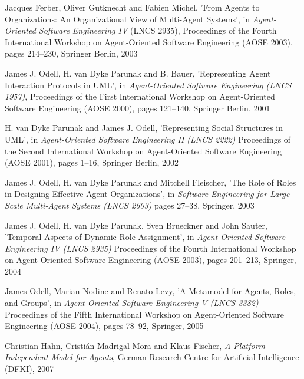 \begin{thebibliography}{99}
Jacques Ferber, Oliver Gutknecht and Fabien Michel,
'From Agents to Organizations: An Organizational View of Multi-Agent Systems',
in \textit{Agent-Oriented Software Engineering IV} (LNCS 2935),
Proceedings of the Fourth International Workshop on Agent-Oriented Software Engineering (AOSE 2003),
pages 214--230,
Springer Berlin, 2003


James J. Odell, H. van Dyke Parunak and B. Bauer,
'Representing Agent Interaction Protocols in UML',
in \textit{Agent-Oriented Software Engineering (LNCS 1957)},
Proceedings of the First International Workshop on Agent-Oriented Software Engineering (AOSE 2000),
pages 121--140,
Springer Berlin, 2001

H. van Dyke Parunak and James J. Odell,
'Representing Social Structures in UML',
in \textit{Agent-Oriented Software Engineering II (LNCS 2222)}
Proceedings of the Second International Workshop on Agent-Oriented Software Engineering (AOSE 2001),
pages 1--16,
Springer Berlin, 2002

James J. Odell, H. van Dyke Parunak and Mitchell Fleischer,
'The Role of Roles in Designing Effective Agent Organizations',
in \textit{Software Engineering for Large-Scale Multi-Agent Systems (LNCS 2603)}
pages 27--38,
Springer, 2003

James J. Odell, H. van Dyke Parunak, Sven Brueckner and John Sauter,
'Temporal Aspects of Dynamic Role Assignment',
in \textit{Agent-Oriented Software Engineering IV (LNCS 2935)}
Proceedings of the Fourth International Workshop on Agent-Oriented Software Engineering (AOSE 2003),
pages 201--213,
Springer, 2004

James Odell, Marian Nodine and Renato Levy,
'A Metamodel for Agents, Roles, and Groups',
in \textit{Agent-Oriented Software Engineering V (LNCS 3382)}
Proceedings of the Fifth International Workshop on Agent-Oriented Software Engineering (AOSE 2004),
pages 78--92,
Springer, 2005


Christian Hahn, Cristián Madrigal-Mora and Klaus Fischer,
\textit{A Platform-Independent Model for Agents},
German Research Centre for Artificial Intelligence (DFKI), 2007


\end{thebibliography}
